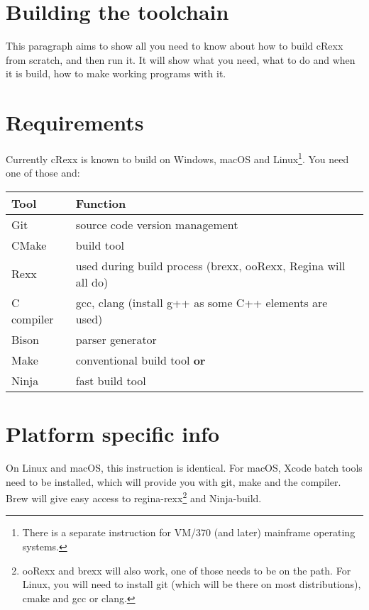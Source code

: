 \hypertarget{building-the-toolchain}{%
\section{\texorpdfstring{Building the \crexx{}
toolchain}{Building the  toolchain}}\label{building-the-toolchain}}

This paragraph aims to show all you need to know about how to build
cRexx from scratch, and then run it. It will show what you need, what to
do and when it is build, how to make working programs with it.

\hypertarget{requirements}{%
\section{Requirements}\label{requirements}}

Currently cRexx is known to build on Windows, macOS and
Linux\footnote{There is a separate instruction for VM/370 (and later)
  mainframe operating systems.}. You need one of those and:

\begin{longtable}[]{@{}ll@{}}
\toprule()
Tool & Function \\
\midrule()
\endhead
Git & source code version management \\
CMake & build tool \\
Rexx & used during build process (brexx, ooRexx, Regina will all do) \\
C compiler & gcc, clang (install g++ as some C++ elements are used) \\
Bison & parser generator \\
Make & conventional build tool \textbf{or} \\
Ninja & fast build tool \\
\bottomrule()
\end{longtable}

\hypertarget{platform-specific-info}{%
\section{Platform specific info}\label{platform-specific-info}}

On Linux and macOS, this instruction is identical. For macOS, Xcode
batch tools need to be installed, which will provide you with git, make
and the compiler. Brew will give easy access to regina-rexx\footnote{ooRexx
  and brexx will also work, one of those needs to be on the path. For
  Linux, you will need to install git (which will be there on most
  distributions), cmake and gcc or clang.} and Ninja-build.

